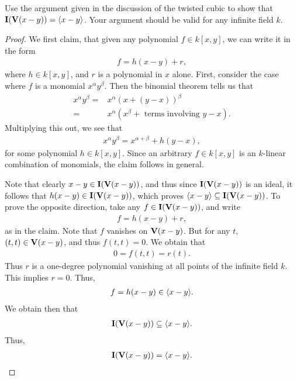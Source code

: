 \begin{exercise}{10}
Use the argument given in the discussion of the twisted cubic to show that $\mathbf{I}(\mathbf{V}(x-y)) = \langle x-y\rangle$. Your argument should be valid for any infinite field $k$.    
\end{exercise}
\begin{proof}
    We first claim, that given any polynomial $f\in k[x,y]$, we can write it in the form
    \begin{align*}
        f = h(x-y) + r,
    \end{align*}
    where $h\in k[x,y]$, and $r$ is a polynomial in $x$ alone. 
    First, consider the case where $f$ is a monomial $x^\alpha y^\beta$. 
    Then the binomial theorem tells us that
    \begin{align*}
        x^\alpha y^\beta 
        = & x^\alpha (x + (y-x))^\beta\\
        = & x^\alpha (x^\beta + \text{ terms involving } y-x).
    \end{align*}
    Multiplying this out, we see that
    \begin{align*}
        x^\alpha y^\beta = x^{\alpha+\beta} + h(y-x),
    \end{align*}
    for some polynomial $h\in k[x,y]$. 
    Since an arbitrary $f\in k[x,y]$ is an $k$-linear combination of monomials, the claim follows in general.
    
    Note that clearly $x-y\in \mathbf{I}(\mathbf{V}(x-y))$, and thus since $\mathbf{I}(\mathbf{V}(x-y))$ is an ideal, it follows that $h(x-y)\in \mathbf{I}(\mathbf{V}(x-y))$, which proves $\langle x-y\rangle \subseteq \mathbf{I}(\mathbf{V}(x-y))$. 
    To prove the opposite direction, take any $f\in \mathbf{I}(\mathbf{V}(x-y))$, and write
    \begin{align*}
        f = h(x-y) + r,
    \end{align*}
    as in the claim. 
    Note that $f$ vanishes on $\mathbf{V}(x-y)$. 
    But for any $t$, $(t,t)\in \mathbf{V}(x-y)$, and thus $f(t,t) = 0$. 
    We obtain that
    \begin{align*}
        0 = f(t,t) = r(t).
    \end{align*}
    Thus $r$ is a one-degree polynomial vanishing at all points of the infinite field $k$. 
    This implies $r= 0$. Thus,
    \begin{align*}
        f = h(x-y) \in \langle x-y\rangle.
    \end{align*}
    We obtain then that
    \begin{align*}
        \mathbf{I}(\mathbf{V}(x-y))\subseteq \langle x-y\rangle.
    \end{align*}
    Thus,
    \begin{align*}
        \mathbf{I}(\mathbf{V}(x-y)) = \langle x-y\rangle.
    \end{align*}
\end{proof}

